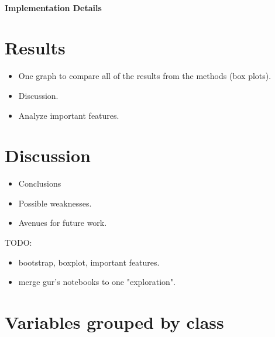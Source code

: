 \documentclass{article}
\newcommand{\todo}[1]{{\color{orange}{TODO: #1}}}
\begin{document}
\paragraph{Implementation Details} \todo{Details about the implementation of the Doubly Robust Estimator.}







\section{Results}

\begin{itemize}
    \item One graph to compare all of the results from the methods (box plots).
    \item Discussion.
    \item Analyze important features.
\end{itemize}

\section{Discussion}

\begin{itemize}
    \item Conclusions
    \item Possible weaknesses.
    \item Avenues for future work.
\end{itemize}


TODO:
\begin{itemize}
    \item bootstrap, boxplot, important features.
    \item merge gur's notebooks to one "exploration".
\end{itemize}



\appendix

\newpage
\section{Variables grouped by class}
\end{document}
